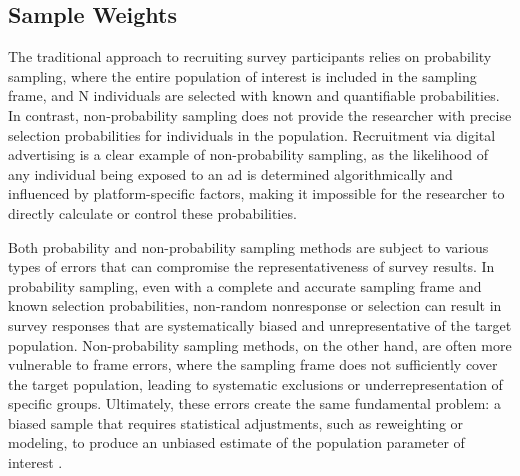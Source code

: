 \documentclass[letterpaper,12pt]{article}
\theoremstyle{proposition}
\begin{document}
\subsection*{Sample Weights}

The traditional approach to recruiting survey participants relies on probability sampling, where the entire population of interest is included in the sampling frame, and N individuals are selected with known and quantifiable probabilities. In contrast, non-probability sampling does not provide the researcher with precise selection probabilities for individuals in the population. Recruitment via digital advertising is a clear example of non-probability sampling, as the likelihood of any individual being exposed to an ad is determined algorithmically and influenced by platform-specific factors, making it impossible for the researcher to directly calculate or control these probabilities.

Both probability and non-probability sampling methods are subject to various types of errors that can compromise the representativeness of survey results. In probability sampling, even with a complete and accurate sampling frame and known selection probabilities, non-random nonresponse or selection can result in survey responses that are systematically biased and unrepresentative of the target population. Non-probability sampling methods, on the other hand, are often more vulnerable to frame errors, where the sampling frame does not sufficiently cover the target population, leading to systematic exclusions or underrepresentation of specific groups. Ultimately, these errors create the same fundamental problem: a biased sample that requires statistical adjustments, such as reweighting or modeling, to produce an unbiased estimate of the population parameter of interest \citep{Kolenikov2016}.


\end{document}
